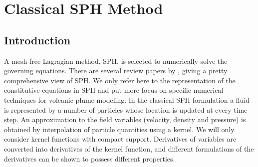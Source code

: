 
\chapter{Classical SPH Method} \label{chapter:classical-SPH}

\section{Introduction}
A mesh-free Lagragian method, SPH, is selected to numerically solve the governing equations. There are several review papers by \citet{monaghan1992smoothed, monaghan2005smoothed, rosswog2009astrophysical, price2012smoothed, monaghan2012smoothed}, giving a pretty comprehensive view of SPH. We only refer here to the representation of the constitutive equations in SPH and put more focus on specific numerical techniques for volcanic plume modeling.
In the classical SPH formulation a fluid is represented by a number of particles whose location is updated at every time step. An approximation to the field variables (velocity, density and pressure) is obtained by interpolation of particle quantities using a kernel.
We will only consider kernel functions with compact support. Derivatives of variables are converted into derivatives of the kernel function, and different formulations of the derivatives can be shown to possess different properties.

